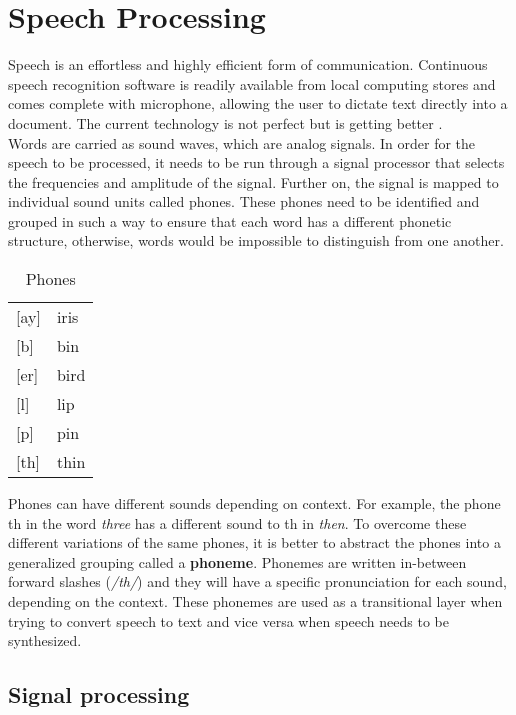 \chapter{Speech Processing}\label{ch:speech_processing}

Speech is an effortless and highly efficient form of communication. Continuous speech recognition software is readily available from local computing stores and comes complete with microphone, allowing the user to dictate text directly into a document. The current technology is not perfect but is getting better \cite[p.~396]{callan2003artificial}.\\

Words are carried as sound waves, which are analog signals. In order for the speech to be processed, it needs to be run through a signal processor that selects the frequencies and amplitude of the signal. Further on, the signal is mapped to individual sound units called phones. These phones need to be identified and grouped in such a way to ensure that each word has a different phonetic structure, otherwise, words would be impossible to distinguish from one another. \\

\begin{table}[]
\centering
\caption{Phones}
\label{my-label}
\begin{tabular}{ll}
{[}ay{]} & iris \\
{[}b{]}  & bin  \\
{[}er{]} & bird \\
{[}l{]}  & lip  \\
{[}p{]}  & pin  \\
{[}th{]} & thin
\end{tabular}
\end{table}

Phones can have different sounds depending on context. For example, the phone th in the word \textit{three} has a different sound to th in \textit{then}. To overcome these different variations of the same phones, it is better to abstract the phones into a generalized grouping called a \textbf{phoneme}. Phonemes are written in-between forward slashes (\textit{/th/}) and they will have a specific pronunciation for each sound, depending on the context. These phonemes are used as a transitional layer when trying to convert speech to text and vice versa when speech needs to be synthesized.\\

\section{Signal processing}

